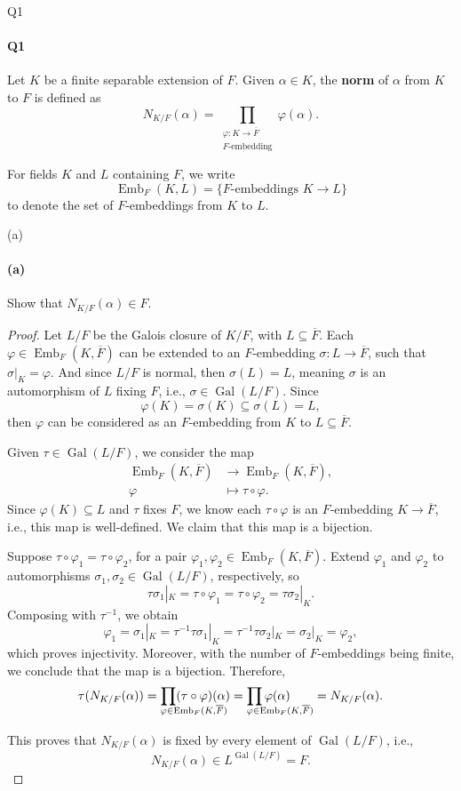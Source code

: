 \documentclass[12pt]{article}
\makeatletter
\newenvironment{fullbox}{\begin{lrbox}{\savefullbox}\begin{minipage}{\dimexpr\textwidth-2\fboxsep\relax}}{\end{minipage}\end{lrbox}\begin{center}\framebox[\textwidth]{\usebox{\savefullbox}}\end{center}}
\newenvironment{pbox}[1][]{\begin{fullbox}\ifx#1\empty\else\paragraph{#1}\fi}{\end{fullbox}}
\renewcommand{\phi}{\varphi}
\newcommand{\<}{\langle}
\renewcommand{\>}{\rangle}
\newcommand{\clo}{\overline}
\DeclareMathOperator{\Gal}{Gal}
\DeclareMathOperator{\Emb}{Emb}
\newcommand\myprod[2]{
    \begin{array}[t]{@{}l@{}}
        {\displaystyle\prod #2} \\[-3pt] \scriptstyle #1 
    \end{array}
}
\makeatother
\begin{document}
\thispagestyle{title}

\begin{pbox}[Q1]
    Let $K$ be a finite separable extension of $F$. Given $\alpha\in K$, the \textbf{norm} of $\alpha$ from $K$ to $F$ is defined as
    \[
        N_{K/F}(\alpha) = \prod_{\substack{\phi:K \to \clo{F} \\ F\text{-embedding}}} \phi(\alpha).
    \]
    
\end{pbox}

For fields $K$ and $L$ containing $F$, we write
\[
    \Emb_F(K, L) = \{F\text{-embeddings } K \to L\}
\]
to denote the set of $F$-embeddings from $K$ to $L$.
    
\begin{pbox}[(a)]
    Show that $N_{K/F}(\alpha) \in F$.
\end{pbox}

\begin{proof}
    Let $L/F$ be the Galois closure of $K/F$, with $L \subseteq \clo{F}$. Each $\phi \in \Emb_F(K, \clo{F})$ can be extended to an $F$-embedding $\sigma : L \to \clo{F}$, such that $\sigma|_K = \phi$. And since $L/F$ is normal, then $\sigma(L) = L$, meaning $\sigma$ is an automorphism of $L$ fixing $F$, i.e., $\sigma \in \Gal(L/F)$. Since
    \[
        \phi(K) = \sigma(K) \subseteq \sigma(L) = L,
    \]
    then $\phi$ can be considered as an $F$-embedding from $K$ to $L \subseteq \clo{F}$.

    Given $\tau \in \Gal(L/F)$, we consider the map
    \begin{align*}
        \Emb_F(K, \clo{F}) &\to \Emb_F(K, \clo{F}), \\
            \phi &\mapsto \tau \circ \phi.
    \end{align*}
    Since $\phi(K) \subseteq L$ and $\tau$ fixes $F$, we know each $\tau \circ \phi$ is an $F$-embedding $K \to \clo{F}$, i.e., this map is well-defined. We claim that this map is a bijection. 
    
    Suppose $\tau \circ \phi_1 = \tau \circ \phi_2$, for a pair $\phi_1, \phi_2 \in \Emb_F(K, \clo{F})$. Extend $\phi_1$ and $\phi_2$ to automorphisms $\sigma_1, \sigma_2 \in \Gal(L/F)$, respectively, so
    \[
        \tau\sigma_1|_K = \tau \circ \phi_1 = \tau \circ \phi_2 = \tau\sigma_2|_K.
    \]
    Composing with $\tau^{-1}$, we obtain
    \[
        \phi_1 = \sigma_1|_K = \tau^{-1}\tau\sigma_1|_K = \tau^{-1}\tau\sigma_2|_K = \sigma_2|_K = \phi_2,
    \]
    which proves injectivity. Moreover, with the number of $F$-embeddings being finite, we conclude that the map is a bijection. Therefore,
    \[
        \tau(N_{K/F}(\alpha))
            = \myprod{\phi \in \Emb_F(K, \clo{F})}{(\tau \circ \phi)(\alpha)}
            = \myprod{\phi \in \Emb_F(K, \clo{F})}{\phi(\alpha)}
            = N_{K/F}(\alpha).
    \]

    This proves that $N_{K/F}(\alpha)$ is fixed by every element of $\Gal(L/F)$, i.e.,
    \[
        N_{K/F}(\alpha) \in L^{\Gal(L/F)} = F.
    \]
    

\end{proof}
\end{document}
